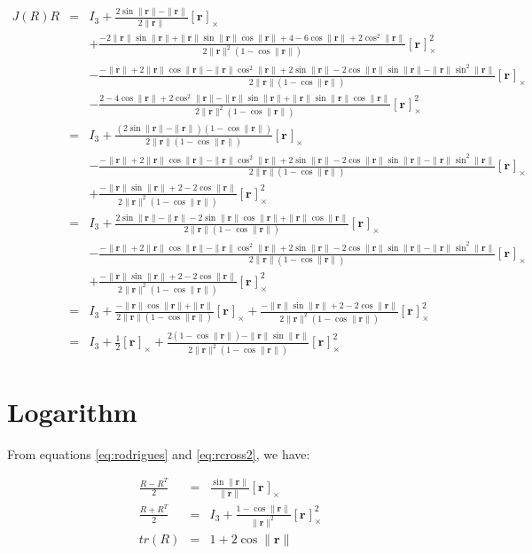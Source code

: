 \documentclass {article}
\newcommand\rot{\mathbf{r}}
\newcommand\rcross[1]{[\rot_{#1}]_{\times}}
\newcommand\normr{\|\rot\|}
\begin{document}
\begin {eqnarray*}
J(R)R &=& I_3 + \frac{2\sin\normr-\normr}{2\normr}\rcross{}\\
&& + \frac{-2\normr\sin\normr+\normr\sin\normr\cos\normr+4-6\cos\normr+2\cos^2\normr}{2\normr^2(1-\cos\normr)}\rcross{}^2\\
&&- \frac{-\normr+2\normr\cos\normr-\normr\cos^2\normr + 2\sin\normr-2\cos\normr\sin\normr - \normr\sin^2\normr}{2\normr(1-\cos\normr)} \rcross{} \\
&&- \frac{2-4\cos\normr+2\cos^2\normr-\normr\sin\normr+\normr\sin\normr\cos\normr}{2\normr^2(1-\cos\normr)} \rcross{}^2\\
&=& I_3 + \frac{(2\sin\normr-\normr)(1-\cos\normr)}{2\normr(1-\cos\normr)}\rcross{}\\
&&- \frac{-\normr+2\normr\cos\normr-\normr\cos^2\normr + 2\sin\normr-2\cos\normr\sin\normr - \normr\sin^2\normr}{2\normr(1-\cos\normr)} \rcross{} \\
&& + \frac{-\normr\sin\normr+2-2\cos\normr}{2\normr^2(1-\cos\normr)}\rcross{}^2\\
&=& I_3 + \frac{2\sin\normr-\normr - 2\sin\normr\cos\normr+\normr\cos\normr}{2\normr(1-\cos\normr)}\rcross{}\\
&&- \frac{-\normr+2\normr\cos\normr-\normr\cos^2\normr + 2\sin\normr-2\cos\normr\sin\normr - \normr\sin^2\normr}{2\normr(1-\cos\normr)} \rcross{} \\
&& + \frac{-\normr\sin\normr+2-2\cos\normr}{2\normr^2(1-\cos\normr)}\rcross{}^2\\
&=& I_3 + \frac{-\normr\cos\normr + \normr}{2\normr(1-\cos\normr)}\rcross{} + \frac{-\normr\sin\normr+2-2\cos\normr}{2\normr^2(1-\cos\normr)}\rcross{}^2\\
&=& I_3 + \frac{1}{2}\rcross{} + \frac{2(1-\cos\normr)-\normr\sin\normr}{2\normr^2(1-\cos\normr)}\rcross{}^2
\end{eqnarray*}

\section{Logarithm}

From equations \ref{eq:rodrigues} and \ref{eq:rcross2}, we have:

\begin{eqnarray}
\label{eq:antisymmetric}
\frac{R - R^T}{2} &=& \frac{\sin \normr}{\normr}\rcross{} \\
\label{eq:symmetric}
\frac{R + R^T}{2} &=& I_3 + \frac{1 - \cos \normr}{\normr^2}\rcross{}^2 \\
\label{eq:trace}
tr(R) &=& 1 + 2 \cos \normr
\end{eqnarray}
\end{document}
